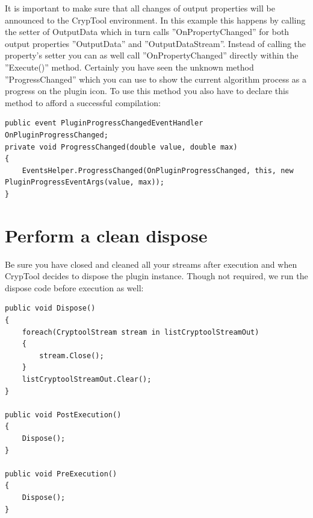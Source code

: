 It is important to make sure that all changes of output properties will be announced to the CrypTool environment. In this example this happens by calling the setter of OutputData which in turn calls ''OnPropertyChanged'' for both output properties ''OutputData'' and ''OutputDataStream''. Instead of calling the property's setter you can as well call ''OnPropertyChanged'' directly within the ''Execute()'' method.\clearpage
Certainly you have seen the unknown method ''ProgressChanged'' which you can use to show the current algorithm process as a progress on the plugin icon.
To use this method you also have to declare this method to afford a successful compilation:
\begin{lstlisting}
public event PluginProgressChangedEventHandler OnPluginProgressChanged;
private void ProgressChanged(double value, double max)
{
	EventsHelper.ProgressChanged(OnPluginProgressChanged, this, new PluginProgressEventArgs(value, max));
}
\end{lstlisting}
\section{Perform a clean dispose}\label{sec:PerformACleanDispose}
Be sure you have closed and cleaned all your streams after execution and when CrypTool decides to dispose the plugin instance. Though not required, we run the dispose code before execution as well:
\begin{lstlisting}
public void Dispose()
{
	foreach(CryptoolStream stream in listCryptoolStreamOut)
	{
		stream.Close();
	}
	listCryptoolStreamOut.Clear();
}

public void PostExecution()
{
	Dispose();
}

public void PreExecution()
{
	Dispose();
}
\end{lstlisting}\clearpage
